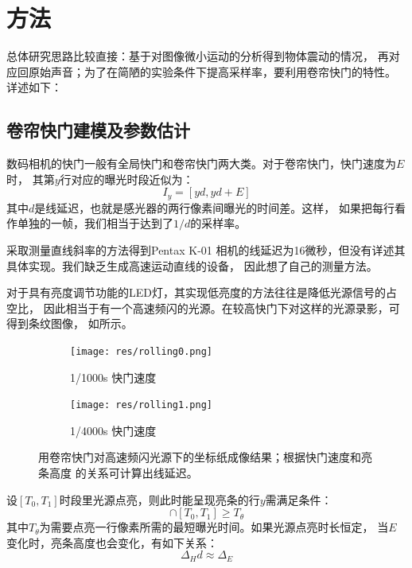 
\section{方法}

总体研究思路比较直接：基于对图像微小运动的分析得到物体震动的情况，
再对应回原始声音；为了在简陋的实验条件下提高采样率，要利用卷帘快门的特性。
详述如下：

\subsection{卷帘快门建模及参数估计\label{sec:rolling-shutter}}
数码相机的快门一般有全局快门和卷帘快门两大类。对于卷帘快门，快门速度为$E$时，
其第$y$行对应的曝光时段近似为：
\begin{equation}
    I_y = [yd, yd+E]
\end{equation}
其中$d$是线延迟，也就是感光器的两行像素间曝光的时间差。这样，
如果把每行看作单独的一帧，我们相当于达到了$1/d$的采样率。

\cite{Davis2014VisualMic}采取测量直线斜率的方法得到Pentax K-01
相机的线延迟为16微秒，但没有详述其具体实现。我们缺乏生成高速运动直线的设备，
因此想了自己的测量方法。

对于具有亮度调节功能的LED灯，其实现低亮度的方法往往是降低光源信号的占空比，
因此相当于有一个高速频闪的光源。在较高快门下对这样的光源录影，可得到条纹图像，
如所示。
\begin{figure}[tb]\begin{center}
    \begin{subfigure}[b]{.5\figwidth}
        \centering
        \texttt{[image: res/rolling0.png]}
        \caption{1/1000s 快门速度}
    \end{subfigure}
    \begin{subfigure}[b]{.5\figwidth}
        \centering
        \texttt{[image: res/rolling1.png]}
        \caption{1/4000s 快门速度}
    \end{subfigure}
    \caption{用卷帘快门对高速频闪光源下的坐标纸成像结果；根据快门速度和亮条高度
        的关系可计算出线延迟。\label{fig:rolling-shutter-record}}
\end{center}\end{figure}

设$[T_0, T_1]$时段里光源点亮，则此时能呈现亮条的行$y$需满足条件：
\begin{equation}
    [yd, yd+E] \cap [T_0, T_1] \ge T_\theta
\end{equation}
其中$T_\theta$为需要点亮一行像素所需的最短曝光时间。如果光源点亮时长恒定，
当$E$变化时，亮条高度也会变化，有如下关系：
\begin{equation}
    \Delta_H d \approx \Delta_E
\end{equation}

